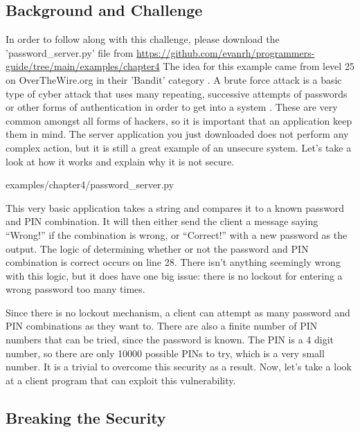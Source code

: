 \documentclass[12pt, oneside, a4paper]{book}
\begin{document}
      \subsection{Background and Challenge}
      In order to follow along with this challenge, please download the 'password\_server.py' file from \url{https://github.com/evanrh/programmers-guide/tree/main/examples/chapter4}
      The idea for this example came from level 25 on OverTheWire.org in their 'Bandit' category \autocite{overthewireOverTheWireLevelGoal}.
      A brute force attack is a basic type of cyber attack that uses many repeating, successive attempts of passwords or other forms of authentication in order to get into a system \autocite{universityGrowingCybersecurityThreats2019}.
      These are very common amongst all forms of hackers, so it is important that an application keep them in mind.
      The server application you just downloaded does not perform any complex action, but it is still a great example of an unsecure system.
      Let's take a look at how it works and explain why it is not secure.

      
      {examples/chapter4/password_server.py}

      This very basic application takes a string and compares it to a known password and PIN combination.
      It will then either send the client a message saying ``Wrong!'' if the combination is wrong, or ``Correct!'' with a new password as the output.
      The logic of determining whether or not the password and PIN combination is correct occurs on line 28.
      There isn't anything seemingly wrong with this logic, but it does have one big issue: there is no lockout for entering a wrong password too many times.

      Since there is no lockout mechanism, a client can attempt as many password and PIN combinations as they want to.
      There are also a finite number of PIN numbers that can be tried, since the password is known.
      The PIN is a 4 digit number, so there are only 10000 possible PINs to try, which is a very small number.
      It is a trivial to overcome this security as a result.
      Now, let's take a look at a client program that can exploit this vulnerability.
      \subsection{Breaking the Security}
\end{document}
